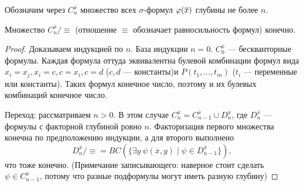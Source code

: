 \begin{definition}
    Обозначим через $C_n^{\overline{x}}$ множество всех $\sigma$-формул $\varphi(\overline{x})$ глубины не более $n$.
\end{definition}

\begin{prop}
    Множество $C_n^{\overline x}/{\equiv}$ (отношение $\equiv$ обозначает равносильность формул) конечно.
\end{prop}

\begin{proof}
    Доказываем индукцией по $n$. База индукции $n=0$. $C_0^{\overline{x}}$ — бескванторные формулы. Каждая формула оттуда эквивалентна булевой комбинации формул вида $x_i=x_j, x_i=c, c=x_i, c=d$ ($c, d$ — константы)и $P(t_1, \dots, t_m)$ ($t_i$ — переменные или константы). Таких формул конечное число, поэтому и их булевых комбинаций конечное число.

    Переход: рассматриваем $n>0$. В этом случае $C_n^{\overline{x}} = C_{n-1}^{\overline{x}}\cup D_n^{\overline{x}}$, где $D_n^{\overline{x}}$ — формулы с факторной глубиной ровно $n$. Факторизация первого множества конечна по предположению индукции, а для второго выполнено
    $$D_n^{\overline{x}}/{\equiv} = BC(\{\exists y~\psi(\overline{x}, y)\mid \psi\in D_{n-1}^{\overline{x}}\}),$$  
    что тоже конечно. (Примечание записывающего: наверное стоит сделать $\psi\in C_{n-1}^{\overline{x}}$, потому что разные подформулы могут иметь разную глубину) 
\end{proof}

